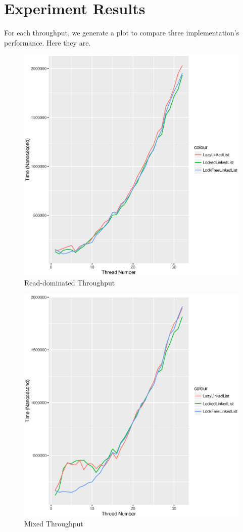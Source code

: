 \documentclass[a4paper]{report}
\begin{document}
\section*{Experiment Results}
For each throughput, we generate a plot to compare three implementation's performance. Here they are.
\begin{figure}[H]
  \includegraphics[scale=0.8]{result/result-tacc-7796986-read}
  \caption{Read-dominated Throughput}
\end{figure}

\begin{figure}[H]
  \includegraphics[scale=0.8]{result/result-tacc-7796986-mixed}
  \caption{Mixed Throughput}
\end{figure}
\end{document}
